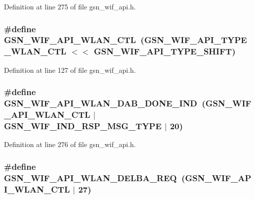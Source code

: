 Definition at line 275 of file gsn\_\-wif\_\-api.h.

\hypertarget{a00606_a9011cb33556c61d17ed1aa2b70183db8}{
\subsubsection[{GSN\_\-WIF\_\-API\_\-WLAN\_\-CTL}]{\setlength{\rightskip}{0pt plus 5cm}\#define GSN\_\-WIF\_\-API\_\-WLAN\_\-CTL~(GSN\_\-WIF\_\-API\_\-TYPE\_\-WLAN\_\-CTL $<$$<$ GSN\_\-WIF\_\-API\_\-TYPE\_\-SHIFT)}}
\label{a00606_a9011cb33556c61d17ed1aa2b70183db8}


Definition at line 127 of file gsn\_\-wif\_\-api.h.

\hypertarget{a00606_ac42ca4847b033a0dd716ba0ea426ac2c}{
\subsubsection[{GSN\_\-WIF\_\-API\_\-WLAN\_\-DAB\_\-DONE\_\-IND}]{\setlength{\rightskip}{0pt plus 5cm}\#define GSN\_\-WIF\_\-API\_\-WLAN\_\-DAB\_\-DONE\_\-IND~(GSN\_\-WIF\_\-API\_\-WLAN\_\-CTL $|$ GSN\_\-WIF\_\-IND\_\-RSP\_\-MSG\_\-TYPE $|$ 20)}}
\label{a00606_ac42ca4847b033a0dd716ba0ea426ac2c}


Definition at line 276 of file gsn\_\-wif\_\-api.h.

\hypertarget{a00606_a34c747ff7eeac716d0ab50e7aa73b73a}{
\subsubsection[{GSN\_\-WIF\_\-API\_\-WLAN\_\-DELBA\_\-REQ}]{\setlength{\rightskip}{0pt plus 5cm}\#define GSN\_\-WIF\_\-API\_\-WLAN\_\-DELBA\_\-REQ~(GSN\_\-WIF\_\-API\_\-WLAN\_\-CTL $|$ 27)}}
\label{a00606_a34c747ff7eeac716d0ab50e7aa73b73a}


